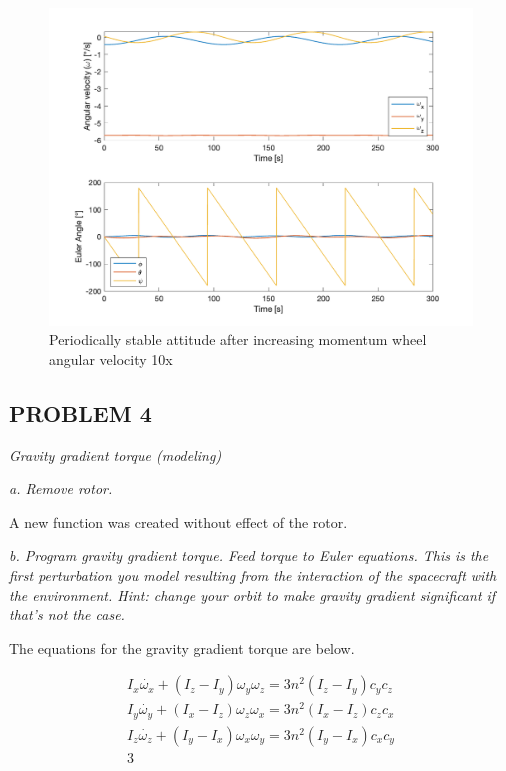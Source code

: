 \begin{figure}[H]
\centering
\includegraphics[scale=0.6]{Images/ps4_problem3e_stable.png}
\caption{Periodically stable attitude after increasing momentum wheel angular velocity 10x}
\label{fig:ps4_problem3e_stable.png}
\end{figure}

\subsection{PROBLEM 4}
\textit{Gravity gradient torque (modeling)}

\textit{a. Remove rotor.}

A new function was created without effect of the rotor.

\textit{b. Program gravity gradient torque. Feed torque to Euler equations. This is the first perturbation you model resulting from the interaction of the spacecraft with the environment. Hint: change your orbit to make gravity gradient significant if that’s not the case.}

The equations for the gravity gradient torque are below.

\begin{align*}
    I_x \dot{\omega_x} + (I_z - I_y) \omega_y \omega_z = 3 n^2 (I_z - I_y) c_y c_z \\
    I_y \dot{\omega_y} + (I_x - I_z) \omega_z \omega_x = 3 n^2 (I_x - I_z) c_z c_x \\
    I_z \dot{\omega_z} + (I_y - I_x) \omega_x \omega_y = 3 n^2 (I_y - I_x) c_x c_y \\
3\end{align*}

